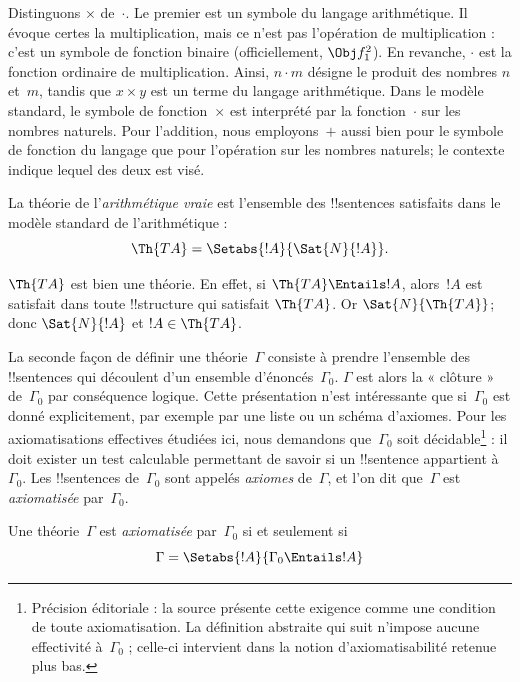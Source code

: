 \documentclass[../../../include/open-logic-section]{subfiles}
\begin{document}
Distinguons $\times$ de~$\cdot$. Le premier est un symbole du langage
arithmétique. Il évoque certes la multiplication, mais ce n'est pas
l'opération de multiplication : c'est un symbole de fonction binaire
(officiellement, $\Obj f^2_1$). En revanche, $\cdot$ est la fonction
ordinaire de multiplication. Ainsi, $n\cdot m$ désigne le produit des
nombres $n$ et~$m$, tandis que $x\times y$ est un terme du langage
arithmétique. Dans le modèle standard, le symbole de fonction~$\times$
est interprété par la fonction~$\cdot$ sur les nombres naturels.
Pour l'addition, nous employons~$+$ aussi bien pour le symbole de
fonction du langage que pour l'opération sur les nombres naturels;
le contexte indique lequel des deux est visé.

\begin{defn}
La théorie de l'\emph{arithmétique vraie} est l'ensemble des
!!{sentence}s satisfaits dans le modèle standard de l'arithmétique :
\[
\Th{TA} = \Setabs{!A}{\Sat{N}{!A}}.
\]
\end{defn}

$\Th{TA}$ est bien une théorie. En effet, si $\Th{TA}\Entails !A$,
alors~$!A$ est satisfait dans toute !!{structure} qui satisfait
$\Th{TA}$. Or $\Sat{N}{\Th{TA}}$; donc $\Sat{N}{!A}$ et
$!A\in\Th{TA}$.

La seconde façon de définir une théorie~$\Gamma$ consiste à prendre
l'ensemble des !!{sentence}s qui découlent d'un ensemble
d'énoncés~$\Gamma_0$. $\Gamma$ est alors la « clôture » de~$\Gamma_0$
par conséquence logique. Cette présentation n'est intéressante que
si~$\Gamma_0$ est donné explicitement, par exemple par une liste ou
un schéma d'axiomes. Pour les axiomatisations effectives étudiées ici, nous demandons que~$\Gamma_0$ soit
décidable\footnote{Précision éditoriale : la source présente cette exigence comme une condition de toute axiomatisation. La définition abstraite qui suit n'impose aucune effectivité à~$\Gamma_0$ ; celle-ci intervient dans la notion d'axiomatisabilité retenue plus bas.} : il doit exister un test calculable permettant de savoir
si un !!{sentence} appartient à~$\Gamma_0$. Les !!{sentence}s
de~$\Gamma_0$ sont appelés \emph{axiomes} de~$\Gamma$, et l'on dit
que~$\Gamma$ est \emph{axiomatisée} par~$\Gamma_0$.

\begin{defn}
Une théorie~$\Gamma$ est \emph{axiomatisée} par~$\Gamma_0$ si et
seulement si
\[
\Gamma = \Setabs{!A}{\Gamma_0 \Entails !A}
\]
\end{defn}
\end{document}
